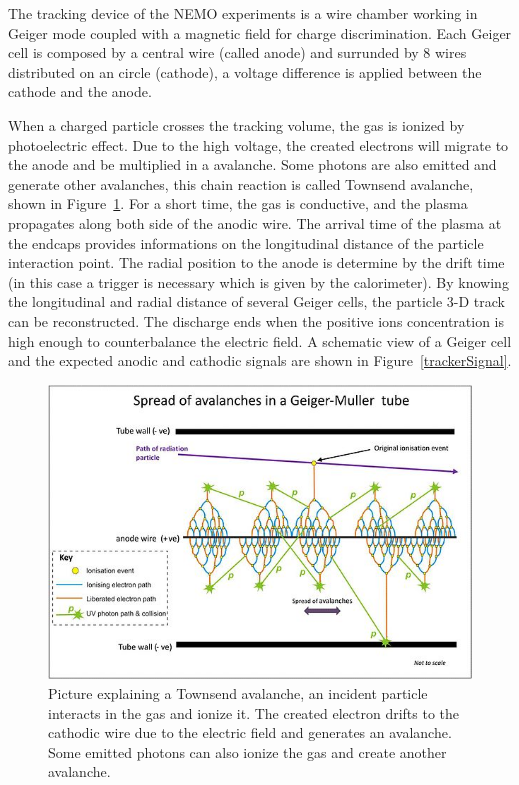 \documentclass[main.tex]{subfiles}
\begin{document}
\NI The tracking device of the NEMO experiments is a wire chamber working in Geiger mode coupled with a magnetic field for charge discrimination. Each Geiger cell is composed by a central wire (called anode) and surrunded by 8 wires distributed on an circle (cathode), a voltage difference is applied between the cathode and the anode.


\bigskip


\NI When a charged particle crosses the tracking volume, the gas is ionized by photoelectric effect. Due to the high voltage, the created electrons will migrate to the anode and be multiplied in a avalanche. Some photons are also emitted and generate other avalanches, this chain reaction is called Townsend avalanche, shown in Figure~\ref{avalancheTownsend}. For a short time, the gas is conductive, and the plasma propagates along both side of the anodic wire. The arrival time of the plasma at the endcaps provides informations on the longitudinal distance of the particle interaction point. The radial position to the anode is determine by the drift time (in this case a trigger is necessary which is given by the calorimeter). By knowing the longitudinal and radial distance of several Geiger cells, the particle 3-D track can be reconstructed. The discharge ends when the positive ions concentration is high enough to counterbalance the electric field. A schematic view of a Geiger cell and the expected anodic and cathodic signals are shown in Figure~\ref{trackerSignal}. 


\begin{figure}[h!]
\begin{center}
\includegraphics[scale=0.70]{pictures/Chap3/avalanche.jpg}
\caption{Picture explaining a Townsend avalanche, an incident particle interacts in the gas and ionize it. The created electron drifts to the cathodic wire due to the electric field and generates an avalanche. Some emitted photons can also ionize the gas and create another avalanche.}
\label{avalancheTownsend}
\end{center}
\end{figure}
\end{document}
